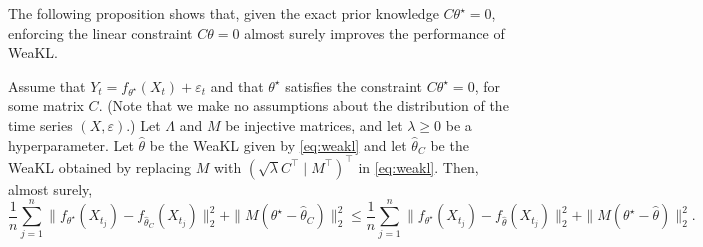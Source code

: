 The following proposition shows that, given the exact prior knowledge $C\theta^\star = 0$, enforcing the linear constraint  $C\theta = 0$ almost surely improves the performance of WeaKL.
\begin{proposition}
\label{prop:prop_lin}
    Assume that $Y_t = f_{\theta^\star}(X_t) + \varepsilon_t$ and that $\theta^\star$ satisfies the constraint $C\theta^\star = 0$, for some matrix $C$. (Note that we make no assumptions about the distribution of the time series $(X, \varepsilon)$.)
    Let $\Lambda$ and $M$ be injective matrices, and let $\lambda \geq 0$ be a hyperparameter. 
    Let $\hat \theta$ be the WeaKL given by \eqref{eq:weakl} and let $\hat \theta_C$ be the WeaKL obtained by replacing $M$ with $(\sqrt{\lambda}C^\top \mid M^\top)^\top$ in \eqref{eq:weakl}.
    Then, almost surely,
    \[\frac{1}{n}\sum_{j=1}^n\| f_{\theta^\star}(X_{t_j}) - f_{\hat \theta_C}(X_{t_j})\|_2^2 + \|M(\theta^\star- \hat \theta_C)\|_2^2\leq \frac{1}{n}\sum_{j=1}^n\| f_{\theta^\star}(X_{t_j}) - f_{\hat \theta}(X_{t_j})\|_2^2 + \|M(\theta^\star- \hat \theta)\|_2^2.\]
\end{proposition}
